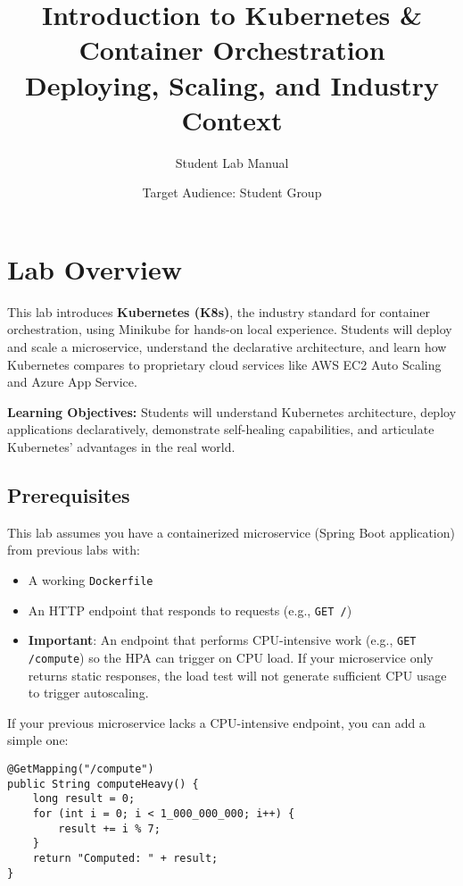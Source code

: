 \documentclass[12pt,a4paper]{article}
\title{\Huge Introduction to Kubernetes \& Container Orchestration \\
       \Large Deploying, Scaling, and Industry Context}
\author{Student Lab Manual}
\date{Target Audience: Student Group}
\begin{document}
\maketitle

\newpage

\tableofcontents

\newpage

\section*{Lab Overview}

This lab introduces \textbf{Kubernetes (K8s)}, the industry standard for container orchestration, using Minikube for hands-on local experience. Students will deploy and scale a microservice, understand the declarative architecture, and learn how Kubernetes compares to proprietary cloud services like AWS EC2 Auto Scaling and Azure App Service.

\textbf{Learning Objectives:} Students will understand Kubernetes architecture, deploy applications declaratively, demonstrate self-healing capabilities, and articulate Kubernetes' advantages in the real world.

\subsection*{Prerequisites}

This lab assumes you have a containerized microservice (Spring Boot application) from previous labs with:
\begin{itemize}
    \item A working \texttt{Dockerfile}
    \item An HTTP endpoint that responds to requests (e.g., \texttt{GET /})
    \item \textbf{Important}: An endpoint that performs CPU-intensive work (e.g., \texttt{GET /compute}) so the HPA can trigger on CPU load. If your microservice only returns static responses, the load test will not generate sufficient CPU usage to trigger autoscaling.
\end{itemize}

If your previous microservice lacks a CPU-intensive endpoint, you can add a simple one:
\begin{lstlisting}[caption=Example CPU-heavy endpoint in Spring Boot]
@GetMapping("/compute")
public String computeHeavy() {
    long result = 0;
    for (int i = 0; i < 1_000_000_000; i++) {
        result += i % 7;
    }
    return "Computed: " + result;
}
\end{lstlisting}
\end{document}
